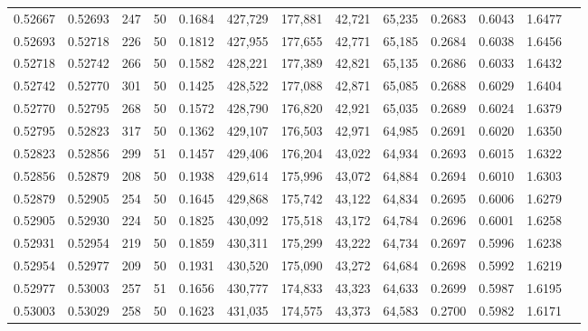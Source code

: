 \begin{tabular}{rrrrrrrrrrrrr}
0.52667 & 0.52693 &   247 &  50 &                                     0.1684 & 427,729 & 177,881 &  42,721 &  65,235 & 0.2683 & 0.6043 & 1.6477 \\
0.52693 & 0.52718 &   226 &  50 &                                     0.1812 & 427,955 & 177,655 &  42,771 &  65,185 & 0.2684 & 0.6038 & 1.6456 \\
0.52718 & 0.52742 &   266 &  50 &                                     0.1582 & 428,221 & 177,389 &  42,821 &  65,135 & 0.2686 & 0.6033 & 1.6432 \\
0.52742 & 0.52770 &   301 &  50 &                                     0.1425 & 428,522 & 177,088 &  42,871 &  65,085 & 0.2688 & 0.6029 & 1.6404 \\
0.52770 & 0.52795 &   268 &  50 &                                     0.1572 & 428,790 & 176,820 &  42,921 &  65,035 & 0.2689 & 0.6024 & 1.6379 \\
0.52795 & 0.52823 &   317 &  50 &                                     0.1362 & 429,107 & 176,503 &  42,971 &  64,985 & 0.2691 & 0.6020 & 1.6350 \\
0.52823 & 0.52856 &   299 &  51 &                                     0.1457 & 429,406 & 176,204 &  43,022 &  64,934 & 0.2693 & 0.6015 & 1.6322 \\
0.52856 & 0.52879 &   208 &  50 &                                     0.1938 & 429,614 & 175,996 &  43,072 &  64,884 & 0.2694 & 0.6010 & 1.6303 \\
0.52879 & 0.52905 &   254 &  50 &                                     0.1645 & 429,868 & 175,742 &  43,122 &  64,834 & 0.2695 & 0.6006 & 1.6279 \\
0.52905 & 0.52930 &   224 &  50 &                                     0.1825 & 430,092 & 175,518 &  43,172 &  64,784 & 0.2696 & 0.6001 & 1.6258 \\
0.52931 & 0.52954 &   219 &  50 &                                     0.1859 & 430,311 & 175,299 &  43,222 &  64,734 & 0.2697 & 0.5996 & 1.6238 \\
0.52954 & 0.52977 &   209 &  50 &                                     0.1931 & 430,520 & 175,090 &  43,272 &  64,684 & 0.2698 & 0.5992 & 1.6219 \\
0.52977 & 0.53003 &   257 &  51 &                                     0.1656 & 430,777 & 174,833 &  43,323 &  64,633 & 0.2699 & 0.5987 & 1.6195 \\
0.53003 & 0.53029 &   258 &  50 &                                     0.1623 & 431,035 & 174,575 &  43,373 &  64,583 & 0.2700 & 0.5982 & 1.6171 \\

\end{tabular}
